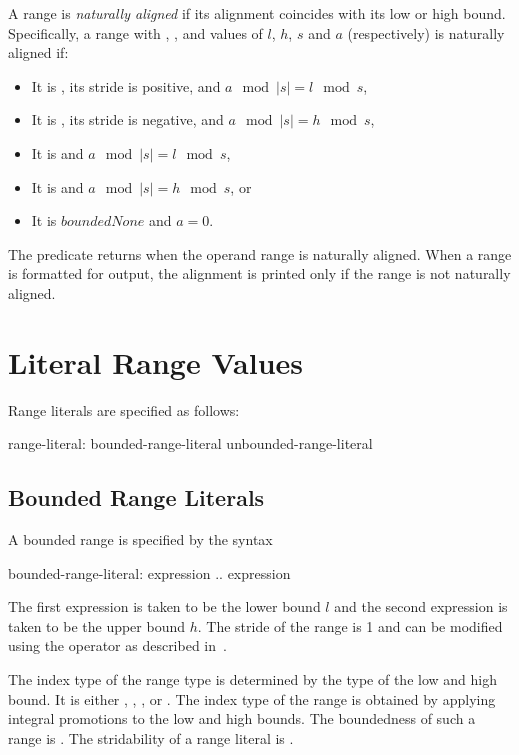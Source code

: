 A range is \emph{naturally aligned} if its alignment coincides with its low or
high bound.  Specifically, a range with , , 
and  values of $l$, $h$, $s$ and $a$ (respectively) is naturally aligned if:
\begin{itemize}
\item It is , its stride is positive, and $a\!\mod |s| = l\!\mod s$,
\item It is , its stride is negative, and $a\!\mod |s| = h\!\mod s$,
\item It is  and $a\!\mod |s| = l\!\mod s$,
\item It is  and $a\!\mod |s| = h\!\mod s$, or
\item It is $boundedNone$ and $a = 0$.
\end{itemize}
\noindent The  predicate returns  when the operand
range is naturally aligned.  When a range is formatted for output, the alignment
is printed only if the range is not naturally aligned.

\section{Literal Range Values}
\label{Range_Literals}

Range literals are specified as follows:
\begin{syntax}
range-literal:
  bounded-range-literal
  unbounded-range-literal
\end{syntax}

\subsection{Bounded Range Literals}
\label{Bounded_Ranges}

A bounded range is specified by the syntax
\begin{syntax}
bounded-range-literal:
  expression .. expression
\end{syntax}
The first expression is taken to be the lower bound $l$ and the second
expression is taken to be the upper bound $h$.  The stride of the
range is 1 and can be modified using the  operator as described
in~.  

The index type of the range type is determined by the type of the
low and high bound.  It is either , ,
, or .  The index type of the range is obtained by
applying integral promotions to the low and high bounds.  The boundedness
of such a range is .  The stridability of a range literal
is .

